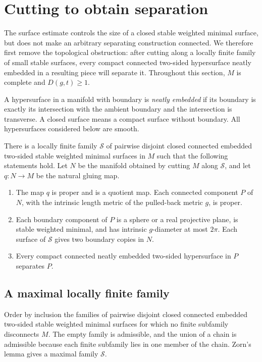 \section{Cutting to obtain separation}\label{sec:cutting}

The surface estimate controls the size of a closed stable weighted minimal
surface, but does not make an arbitrary separating construction connected.
We therefore first remove the topological obstruction: after cutting along
a locally finite family of small stable surfaces, every compact connected
two-sided hypersurface neatly embedded in a resulting piece will separate
it. Throughout this
section, $M$ is complete and $D(g,t)\geq1$.

A hypersurface in a manifold with boundary is \emph{neatly embedded} if
its boundary is exactly its intersection with the ambient boundary and
the intersection is transverse. A closed surface means a compact surface
without boundary. All hypersurfaces considered below are smooth.

\begin{proposition}\label{prop:separating-cut}
There is a locally finite family $\mathcal S$ of pairwise disjoint closed
connected embedded two-sided stable weighted minimal surfaces in $M$
such that the following statements hold. Let $N$ be the manifold obtained
by cutting $M$ along $\mathcal S$, and let $q:N\to M$ be the natural
gluing map.
\begin{enumerate}
\item The map $q$ is proper and is a quotient map. Each connected component
$P$ of $N$, with the intrinsic length metric of the pulled-back metric
$g$, is proper.
\item Each boundary component of $P$ is a sphere or a real projective
plane, is stable weighted minimal, and has intrinsic $g$-diameter at most
$2\pi$. Each surface of $\mathcal S$ gives two boundary copies in $N$.
\item Every compact connected neatly embedded two-sided hypersurface
in $P$ separates $P$.
\end{enumerate}
\end{proposition}

\subsection{A maximal locally finite family}

Order by inclusion the families of pairwise disjoint closed connected
embedded two-sided stable weighted minimal surfaces for which no finite
subfamily disconnects $M$. The empty family is admissible, and the union
of a chain is admissible because each finite subfamily lies in one member
of the chain. Zorn's lemma gives a maximal family $\mathcal S$.

